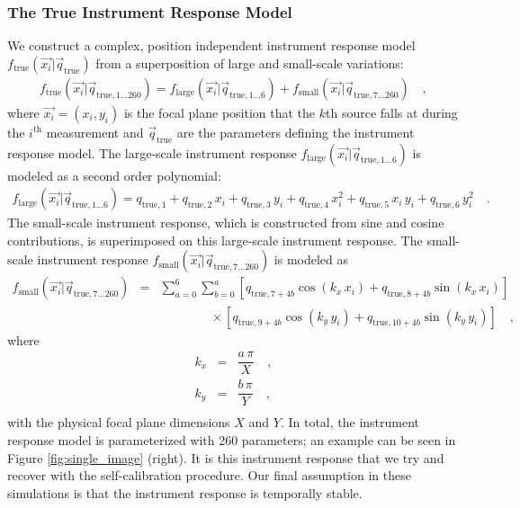 \documentclass[manuscript]{aastex}
\newcommand{\true}{\text{true}}
\begin{document}
\subsubsection{The True Instrument Response Model}
\label{sec:instrument_response_model}
We construct a complex, position independent instrument response model $f_\true(\vec{x_i} | \vec{q}_{\true})$ from a superposition of large and small-scale variations:
\begin{eqnarray*}
f_\true(\vec{x_i} | \vec{q}_{\true, 1 \ldots 260}) = f_\text{large}(\vec{x_i} | \vec{q}_{\true, 1 \ldots 6}) + f_\text{small}(\vec{x_i} | \vec{q}_{\true, 7 \ldots 260}) \quad ,
\end{eqnarray*}
where $\vec{x_i} = (x_i, y_i)$ is the focal plane position that the $k$th source falls at during the $i^\text{th}$ measurement and $\vec{q}_\true$ are the parameters defining the instrument response model. The large-scale instrument response $f_\text{large}(\vec{x_i} | \vec{q}_{\true, 1 \ldots 6})$ is modeled as a second order polynomial:
\begin{eqnarray*}
f_\text{large}(\vec{x_i} | \vec{q}_{\true, 1 \ldots 6}) = q_{\true, 1} + q_{\true, 2} \, x_i + q_{\true, 3} \, y_i + q_{\true, 4} \, x_i^2 + q_{\true, 5} \, x_i \, y_i  + q_{\true, 6} \, y_i^2  \quad .
\end{eqnarray*}
The small-scale instrument response, which is constructed from sine and cosine contributions, is superimposed on this large-scale instrument response. The small-scale instrument response $f_\text{small}(\vec{x_i} | \vec{q}_{\true, 7 \ldots 260})$ is modeled as
\begin{eqnarray*}
f_\text{small}(\vec{x_i} | \vec{q}_{\true, 7\ldots 260})  & = &  \sum_{a=0}^6 \sum_{b=0}^a \left[ q_{\true, 7+4b} \cos (k_x \, x_i) + q_{\true, 8+4b} \sin (k_x \, x_i) \right] \\
& & \qquad \qquad \times \left[ q_{\true, 9+4b} \cos (k_y \, y_i) + q_{\true, 10+4b} \sin (k_y \, y_i) \right] \quad ,
\end{eqnarray*}
where
\begin{eqnarray*}
k_x & = & \dfrac{a \, \pi}{X} \quad ,\\
k_y & = & \dfrac{b \, \pi}{Y} \quad ,\\
\end{eqnarray*}
with the physical focal plane dimensions $X$ and $Y$. In total, the instrument response model is parameterized with 260 parameters; an example can be seen in Figure \ref{fig:single_image}      (right). It is this instrument response that we try and recover with the self-calibration procedure. Our final assumption in these simulations is that the instrument response is temporally stable. 
\end{document}
